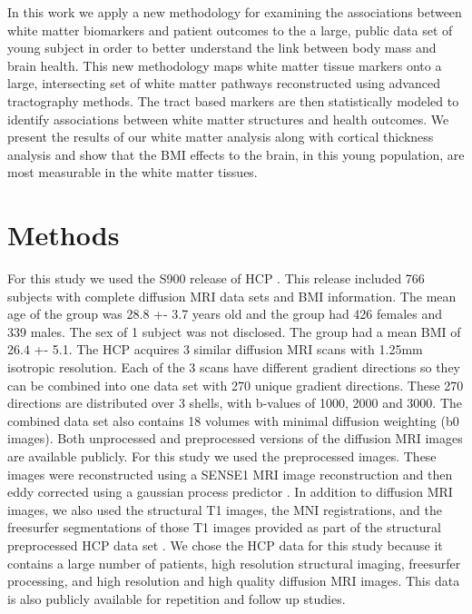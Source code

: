 	In this work we apply a new methodology for examining the associations between white matter biomarkers and patient outcomes to the a large, public data set of young subject in order to better understand the link between body mass and brain health. This new methodology maps white matter tissue markers onto a large, intersecting set of white matter pathways reconstructed using advanced tractography methods. The tract based markers are then statistically modeled to identify associations between white matter structures and health outcomes. We present the results of our white matter analysis along with cortical thickness analysis and show that the BMI effects to the brain, in this young population, are most measurable in the white matter tissues.
    
\section{Methods}
	For this study we used the S900 release of HCP \cite{Van_Essen_2013}. This release included 766 subjects with complete diffusion MRI data sets and BMI information. The mean age of the group was 28.8 +- 3.7 years old and the group had 426 females and 339 males. The sex of 1 subject was not disclosed. The group had a mean BMI of 26.4 +- 5.1. The HCP acquires 3 similar diffusion MRI scans with 1.25mm isotropic resolution. Each of the 3 scans have different gradient directions so they can be combined into one data set with 270 unique gradient directions. These 270 directions are distributed over 3 shells, with b-values of 1000, 2000 and 3000. The combined data set also contains 18 volumes with minimal diffusion weighting (b0 images). Both unprocessed and preprocessed versions of the diffusion MRI images are available publicly. For this study we used the preprocessed images. These images were reconstructed using a SENSE1 MRI image reconstruction and then eddy corrected using a gaussian process predictor \cite{Sotiropoulos_2013}. In addition to diffusion MRI images, we also used the structural T1 images, the MNI registrations, and the freesurfer segmentations of those T1 images provided as part of the structural preprocessed HCP data set \cite{Glasser_2013}. We chose the HCP data for this study because it contains a large number of patients, high resolution structural imaging, freesurfer processing, and high resolution and high quality diffusion MRI images. This data is also publicly available for repetition and follow up studies.
	
